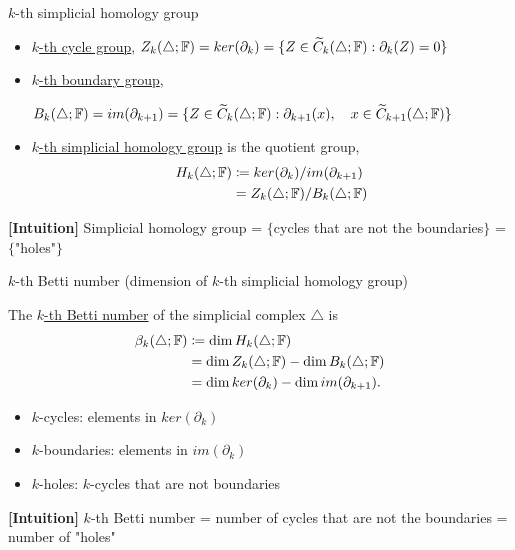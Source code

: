\documentclass[xcolor={dvipsnames,svgnames}]{beamer}
\begin{document}
\begin{frame}{$k$-th simplicial homology group}
    \begin{defn}
\label{kth-homology-group}
    \begin{itemize}
        \item \underline{$k$-th cycle group}, 
        $Z_k(\triangle; \mathbb{F}) = ker(\partial_k) = \{Z \in \widetilde{C}_k(\triangle; \mathbb{F}): \partial_k(Z) = 0\}$ 
        \item \underline{$k$-th boundary group}, 
        
        $B_k(\triangle;\mathbb{F}) = im(\partial_{k+1}) = \{Z \in \widetilde{C}_k(\triangle; \mathbb{F}): \partial_{k+1}(x), \quad x \in \widetilde{C}_{k+1}(\triangle; \mathbb{F})\}$ 
        \item \underline{$k$-th simplicial homology group} is the quotient group,
        \begin{align}
        H_k(\triangle;\mathbb{F}) &\coloneqq ker(\partial_k) / im(\partial_{k+1})\\
        &= Z_k(\triangle;\mathbb{F}) / B_k(\triangle;\mathbb{F})
        \end{align}
    \end{itemize}
\end{defn}
    \textbf{[Intuition]} Simplicial homology group = $\{$cycles that are not the boundaries$\}$ = $\{$"holes"$\}$ 
\end{frame}

\begin{frame}{$k$-th Betti number (dimension of $k$-th simplicial homology group)}
    \begin{defn}
\label{kth-betti}
    The \underline{$k$-th Betti number} of the simplicial complex $\triangle$ is
    \begin{align}
        \beta_k(\triangle;\mathbb{F}) &\coloneqq \dim H_k(\triangle;\mathbb{F}) \\
        &= \dim Z_k(\triangle; \mathbb{F}) - \dim B_k(\triangle;\mathbb{F}) \\
        &= \dim ker(\partial_k) - \dim im(\partial_{k + 1}).
    \end{align}
    
    \begin{itemize}
        \item $k$-cycles: elements in $ker(\partial_k)$
        \item $k$-boundaries: elements in $im(\partial_k)$
        \item $k$-holes: $k$-cycles that are not boundaries
    \end{itemize}
\end{defn} 
\textbf{[Intuition]} $k$-th Betti number = number of cycles that are not the boundaries = number of "holes" 
\end{frame}
\end{document}
